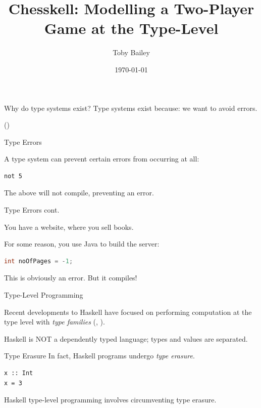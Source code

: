\documentclass{beamer}
\title{Chesskell: Modelling a Two-Player Game at the Type-Level}
\author{Toby Bailey}
\institute{Department of Computer Science}
\date{\today}
\begin{document}
\frame{\titlepage}

\begin{frame}{Why do type systems exist?}
Type systems exist because: \pause we want to avoid errors.

(\cite{cardellitypes})


\end{frame}

\begin{frame}[fragile]{Type Errors}

A type system can prevent certain errors from occurring at all:

\begin{lstlisting}
not 5
\end{lstlisting}

The above will not compile, preventing an error.
    
\end{frame}

\begin{frame}[fragile]{Type Errors cont.}

You have a website, where you sell books.

\pause

For some reason, you use Java to build the server:

\begin{lstlisting}[language=Java]
int noOfPages = -1;
\end{lstlisting}

This is obviously an error. But it compiles!
    
\end{frame}

\begin{frame}[fragile]{Type-Level Programming}

Recent developments to Haskell have focused on performing computation at the type level with \emph{type families} (\cite{opentfs}, \cite{closedtfs}).

Haskell is NOT a dependently typed language; types and values are separated.
    
\end{frame}

\begin{frame}[fragile]{Type Erasure}
In fact, Haskell programs undergo \emph{type erasure}.

\pause

\begin{lstlisting}
x :: Int
x = 3
\end{lstlisting}

Haskell type-level programming involves circumventing type erasure.

\end{frame}
\end{document}
